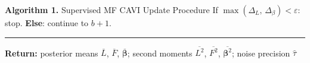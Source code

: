 \documentclass{article}[12pt]
\begin{document}
\begin{algobox}{\textbf{Algorithm 1.} Supervised MF CAVI Update Procedure}
\hspace{2em}If $\max\!\left(\Delta_L,\,\Delta_\beta\right) < \varepsilon$: stop. \textbf{Else}: continue to $b+1$.

\medskip
\hrule
\medskip

\textbf{Return:} posterior means $\overline{L}$, $\overline{F}$, $\overline{\bm{\beta}}$;
second moments $\overline{L^2}$, $\overline{F^2}$, $\overline{\bm{\beta}^2}$;
noise precision $\hat{\tau}$

\end{algobox}

\end{document}
